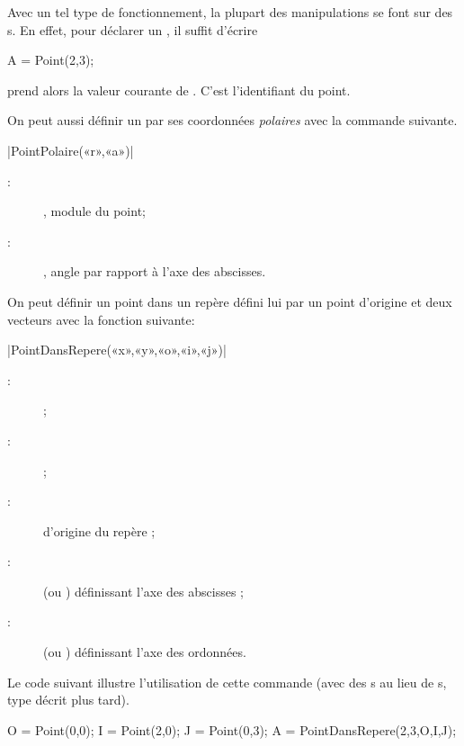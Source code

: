 \documentclass[a4paper,french]{article}
\begin{document}
Avec un tel type de fonctionnement, la plupart des manipulations se
font sur des s. En effet, pour déclarer un
, il suffit d'écrire
\begin{mpcode}
A = Point(2,3);
\end{mpcode}
 prend alors la valeur courante de . C'est
l'identifiant du point.

On peut aussi définir un  par ses coordonnées \emph{polaires}
avec la commande suivante.

\begin{colourband}
\macro|PointPolaire(«r»,«a»)|
\begin{description}
  \item[:] , module du point;
  \item[:] , angle par rapport à l'axe des abscisses.
\end{description}
\end{colourband}
\bigskip



On peut définir un point dans un repère défini lui par un point
d'origine et deux vecteurs avec la fonction suivante:
\begin{colourband}
\macro|PointDansRepere(«x»,«y»,«o»,«i»,«j»)|
\begin{description}
  \item[:]  ;
  \item[:]  ;
  \item[:]  d'origine du repère ;
  \item[:]  (ou ) définissant l'axe des abscisses ;
  \item[:]  (ou ) définissant l'axe des ordonnées.
\end{description}
\end{colourband}

\bigskip

Le code suivant illustre l'utilisation de cette commande (avec des
s au lieu de s, type décrit plus tard). 
\begin{mpcode}
O = Point(0,0);
I = Point(2,0);
J = Point(0,3);
A = PointDansRepere(2,3,O,I,J);
\end{mpcode}
\end{document}
